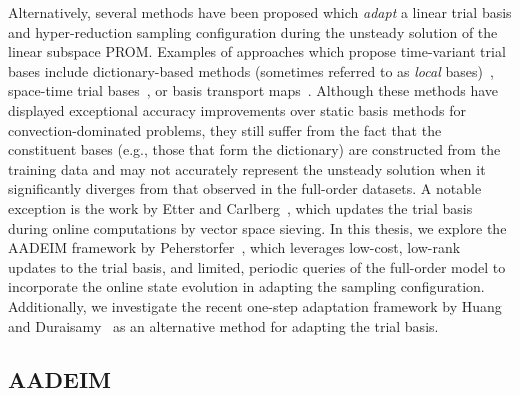 Alternatively, several methods have been proposed which \textit{adapt} a linear trial basis and hyper-reduction sampling configuration during the unsteady solution of the linear subspace PROM. Examples of approaches which propose time-variant trial bases include dictionary-based methods (sometimes referred to as \textit{local} bases)~\cite{Amsallem2012,Peherstorfer2014,Abgrall2016}, space-time trial bases~\cite{Choi2019,Hoang2022}, or basis transport maps~\cite{Iollo2014}. Although these methods have displayed exceptional accuracy improvements over static basis methods for convection-dominated problems, they still suffer from the fact that the constituent bases (e.g., those that form the dictionary) are constructed from the training data and may not accurately represent the unsteady solution when it significantly diverges from that observed in the full-order datasets. A notable exception is the work by Etter and Carlberg~\cite{Etter2019}, which updates the trial basis during online computations by vector space sieving. In this thesis, we explore the AADEIM framework by Peherstorfer~\cite{Peherstorfer2015,Peherstorfer2020Adaptive}, which leverages low-cost, low-rank updates to the trial basis, and limited, periodic queries of the full-order model to incorporate the online state evolution in adapting the sampling configuration. Additionally, we investigate the recent one-step adaptation framework by Huang and Duraisamy~\cite{Huang2022a} as an alternative method for adapting the trial basis.

\subsection{AADEIM}

